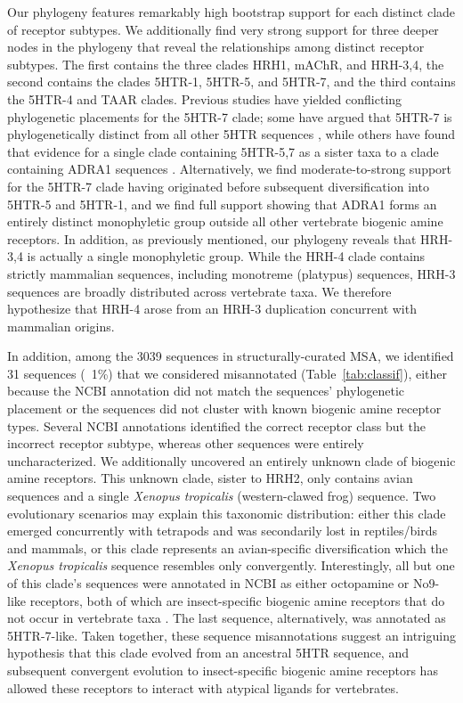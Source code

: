 \documentclass[fleqn,10pt]{wlpeerj}
\begin{document}
Our phylogeny features remarkably high bootstrap support for each distinct clade of receptor subtypes. We additionally find very strong support for three deeper nodes in the phylogeny that reveal the relationships among distinct receptor subtypes. The first contains the three clades HRH1, mAChR, and HRH-3,4, the second contains the clades 5HTR-1, 5HTR-5, and 5HTR-7, and the third contains the 5HTR-4 and TAAR clades. Previous studies have yielded conflicting phylogenetic placements for the 5HTR-7 clade; some have argued that 5HTR-7 is phylogenetically distinct from all other 5HTR sequences \citep{KakaralaJamil2014}, while others have found that evidence for a single clade containing 5HTR-5,7 as a sister taxa to a clade containing ADRA1 sequences \citep{Fredrikssonetal2003}. Alternatively, we find moderate-to-strong support for the 5HTR-7 clade having originated before subsequent diversification into 5HTR-5 and 5HTR-1, and we find full support showing that ADRA1 forms an entirely distinct monophyletic group outside all other vertebrate biogenic amine receptors. In addition, as previously mentioned, our phylogeny reveals that HRH-3,4 is actually a single monophyletic group. While the HRH-4 clade contains strictly mammalian sequences, including monotreme (platypus) sequences, HRH-3 sequences are broadly distributed across vertebrate taxa. We therefore hypothesize that HRH-4 arose from an HRH-3 duplication concurrent with mammalian origins.

In addition, among the 3039 sequences in structurally-curated MSA, we identified 31 sequences (~1\%) that we considered misannotated (Table~\ref{tab:classif}), either because the NCBI annotation did not match the sequences' phylogenetic placement or the sequences did not cluster with known biogenic amine receptor types. Several NCBI annotations identified the correct receptor class but the incorrect receptor subtype, whereas other sequences were entirely uncharacterized. We additionally uncovered an entirely unknown clade of biogenic amine receptors. This unknown clade, sister to HRH2, only contains avian sequences and a single \emph{Xenopus tropicalis} (western-clawed frog) sequence. Two evolutionary scenarios may explain this taxonomic distribution: either this clade emerged concurrently with tetrapods and was secondarily lost in reptiles/birds and mammals, or this clade represents an avian-specific diversification which the \emph{Xenopus tropicalis} sequence resembles only convergently. Interestingly, all but one of this clade's sequences were annotated in NCBI as either octopamine or No9-like receptors, both of which are insect-specific biogenic amine receptors that do not occur in vertebrate taxa \citep{Roeder2005}. The last sequence, alternatively, was annotated as 5HTR-7-like. Taken together, these sequence misannotations suggest an intriguing hypothesis that this clade evolved from an ancestral 5HTR sequence, and subsequent convergent evolution to insect-specific biogenic amine receptors has allowed these receptors to interact with atypical ligands for vertebrates.
\end{document}
